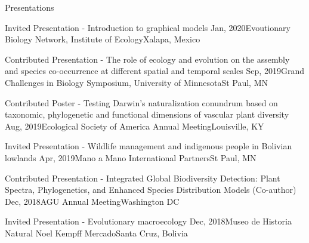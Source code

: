 \documentclass{resume} %
\begin{document}
\begin{rSection}{Presentations}
\begin{sSubsection}{Invited Presentation - Introduction to graphical models}{ }{Jan, 2020}{Evoutionary Biology Network, Institute of Ecology}{Xalapa, Mexico}
\end{sSubsection}

\begin{sSubsection}{Contributed Presentation - The role of ecology and evolution on the assembly and species co-occurrence at different spatial and temporal scales}{ }{Sep, 2019}{Grand Challenges in Biology Symposium, University of Minnesota}{St Paul, MN}
\end{sSubsection}

\begin{sSubsection}{Contributed Poster - Testing Darwin's naturalization conundrum based on taxonomic, phylogenetic and functional dimensions of vascular plant diversity}{ }{Aug, 2019}{Ecological Society of America Annual Meeting}{Louisville, KY}
\end{sSubsection}

\begin{sSubsection}{Invited Presentation - Wildlife management and indigenous people in Bolivian lowlands}{ }{Apr, 2019}{Mano a Mano International Partners}{St Paul, MN}
\end{sSubsection}

\begin{sSubsection}{Contributed Presentation - Integrated Global Biodiversity Detection: Plant Spectra, Phylogenetics, and Enhanced Species Distribution Models}{ (Co-author) }{Dec, 2018}{AGU Annual Meeting}{Washington DC}
\end{sSubsection}

\begin{sSubsection}{Invited Presentation - Evolutionary macroecology}{ }{Dec, 2018}{Museo de Historia Natural Noel Kempff Mercado}{Santa Cruz, Bolivia}
\end{sSubsection}


\end{rSection}
\end{document}
